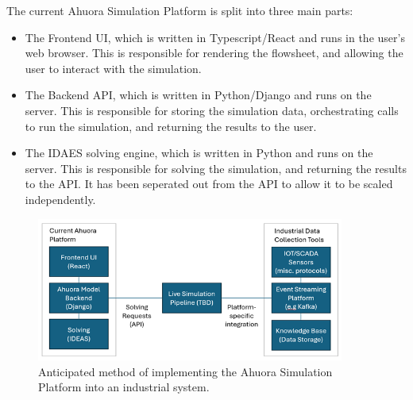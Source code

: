 \documentclass[12pt]{report}
\begin{document}
The current Ahuora Simulation Platform is split into three main parts:

\begin{itemize}
    \item The Frontend UI, which is written in Typescript/React and runs in the user's web browser. This is responsible for rendering the flowsheet, and allowing the user to interact with the simulation.
    \item The Backend API, which is written in Python/Django and runs on the server. This is responsible for storing the simulation data, orchestrating calls to run the simulation, and returning the results to the user.
    \item The IDAES solving engine, which is written in Python and runs on the server. This is responsible for solving the simulation, and returning the results to the API. It has been seperated out from the API to allow it to be scaled independently.
\end{itemize}


\begin{figure}
    \centering
    \includegraphics[width=0.9\textwidth]{architecture.png}
    \caption{Anticipated method of implementing the Ahuora Simulation Platform into an industrial system.}
    \label{fig:architecture}
\end{figure}
\end{document}
